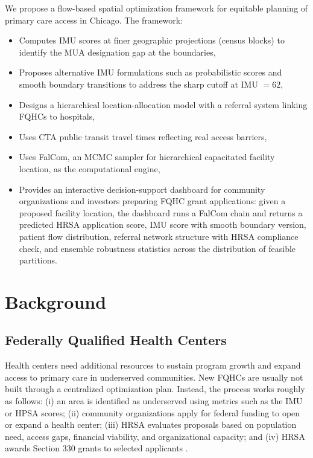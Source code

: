 \documentclass[11pt]{article}
\begin{document}
We propose a flow-based spatial optimization framework for equitable planning of primary care access in Chicago. The framework:
\begin{itemize}
    \item Computes IMU scores at finer geographic projections (census blocks) to identify the MUA designation gap at the boundaries,
    \item Proposes alternative IMU formulations such as probabilistic scores and smooth boundary transitions to address the sharp cutoff at IMU $= 62$,
    \item Designs a hierarchical location-allocation model with a referral system linking FQHCs to hospitals,
    \item Uses CTA public transit travel times reflecting real access barriers,
    \item Uses FalCom, an MCMC sampler for hierarchical capacitated facility location, as the computational engine,
    \item Provides an interactive decision-support dashboard for community organizations
    and investors preparing FQHC grant applications: given a proposed facility location,
    the dashboard runs a FalCom chain and returns a predicted HRSA application score,
    IMU score with smooth boundary version, patient flow distribution, referral network
    structure with HRSA compliance check, and ensemble robustness statistics across the
    distribution of feasible partitions.
\end{itemize}


\section{Background}\label{sec:background}


\subsection{Federally Qualified Health Centers}

Health centers need additional resources to sustain program growth and expand access to primary 
care in underserved communities. New FQHCs are usually not built through a centralized optimization 
plan. Instead, the process works roughly as follows: (i) an area is identified as underserved using 
metrics such as the IMU or HPSA scores; (ii) community organizations apply for federal funding to 
open or expand a health center; (iii) HRSA evaluates proposals based on population need, access gaps, 
financial viability, and organizational capacity; and (iv) HRSA awards Section 330 grants to selected 
applicants \cite{HRSA_BPHC}.
\end{document}
